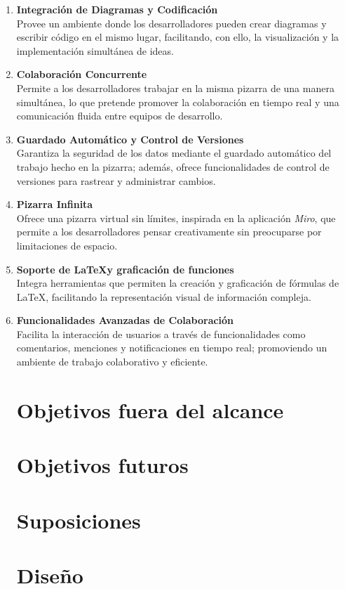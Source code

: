 \documentclass[a4paper, oneside, final]{scrartcl}
\begin{document}
\begin{enumerate}
\item \textbf{Integración de Diagramas y Codificación}\\
  Provee un ambiente donde los desarrolladores pueden crear diagramas y escribir
  código en el mismo lugar, facilitando, con ello, la visualización y la
  implementación simultánea de ideas.

\item \textbf{Colaboración Concurrente}\\
  Permite a los desarrolladores trabajar en la misma pizarra de una manera
  simultánea, lo que pretende promover la colaboración en tiempo real y una
  comunicación fluida entre equipos de desarrollo.

\item \textbf{Guardado Automático y Control de Versiones}\\
  Garantiza la seguridad de los datos mediante el guardado automático del
  trabajo hecho en la pizarra; además, ofrece funcionalidades de control de
  versiones para rastrear y administrar cambios.

\item \textbf{Pizarra Infinita}\\
  Ofrece una pizarra virtual sin límites, inspirada en la aplicación
  \textit{Miro}, que permite a los desarrolladores pensar creativamente sin
  preocuparse por limitaciones de espacio.

\item \textbf{Soporte de \LaTeX y graficación de funciones}\\
  Integra herramientas que permiten la creación y graficación de fórmulas de
  \LaTeX, facilitando la representación visual de información compleja.

\item \textbf{Funcionalidades Avanzadas de Colaboración}\\
  Facilita la interacción de usuarios a través de funcionalidades como
  comentarios, menciones y notificaciones en tiempo real; promoviendo un
  ambiente de trabajo colaborativo y eficiente.

  \section{Objetivos fuera del alcance}
  \section{Objetivos futuros}
  \section{Suposiciones}

  \section{Diseño}

\end{enumerate}
\end{document}
